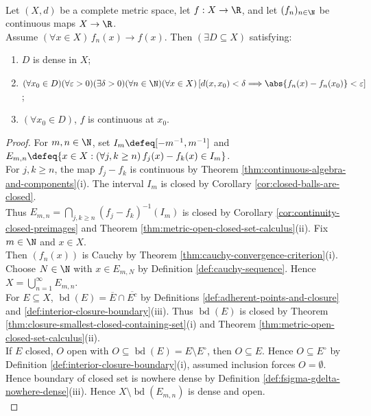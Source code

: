 \begin{theorem} \label{thm:pointwise-limit-continuous-on-dense-set} \\
Let $(X,d)$ be a complete metric space, let $f:X\to\R$, and let $(f_n)_{n\in\N}$ be continuous maps $X\to\R$.\\
Assume $(\forall x\in X)\,f_n(x)\to f(x)$. Then $(\exists D\subseteq X)$ satisfying:
\begin{enumerate}[label=(\roman*)]
\setlength{\itemsep}{0pt}
\item $D$ is dense in $X$;
\item $(\forall x_0\in D)(\forall\varepsilon>0)(\exists\delta>0)(\forall n\in\N)(\forall x\in X)\,[d(x,x_0)<\delta\Longrightarrow\abs{f_n(x)-f_n(x_0)}<\varepsilon]$;
\item $(\forall x_0\in D)$, $f$ is continuous at $x_0$.
\end{enumerate}
\begin{proof}
For $m,n\in\N$, set $I_m\defeq[-m^{-1},m^{-1}]$ and $E_{m,n}\defeq\{x\in X:(\forall j,k\geq n)\,f_j(x)-f_k(x)\in I_m\}$.\\
For $j,k\geq n$, the map $f_j-f_k$ is continuous by Theorem \ref{thm:continuous-algebra-and-components}(i). The interval $I_m$ is closed by Corollary \ref{cor:closed-balls-are-closed}.\\
Thus $E_{m,n}=\bigcap\limits_{j,k\geq n}(f_j-f_k)^{-1}(I_m)$ is closed by Corollary \ref{cor:continuity-closed-preimages} and Theorem \ref{thm:metric-open-closed-set-calculus}(ii). Fix $m\in\N$ and $x\in X$.\\
Then $(f_n(x))$ is Cauchy by Theorem \ref{thm:cauchy-convergence-criterion}(i). Choose $N\in\N$ with $x\in E_{m,N}$ by Definition \ref{def:cauchy-sequence}. Hence $X=\bigcup\limits_{n=1}^{\infty}E_{m,n}$.\\
For $E\subseteq X$, $\operatorname{bd}(E)=\overline{E}\cap\overline{E^c}$ by Definitions \ref{def:adherent-points-and-closure} and \ref{def:interior-closure-boundary}(iii). Thus $\operatorname{bd}(E)$ is closed by Theorem \ref{thm:closure-smallest-closed-containing-set}(i) and Theorem \ref{thm:metric-open-closed-set-calculus}(ii).\\
If $E$ closed, $O$ open with $O\subseteq\operatorname{bd}(E)=E\setminus E^\circ$, then $O\subseteq E$. Hence $O\subseteq E^\circ$ by Definition \ref{def:interior-closure-boundary}(i), assumed inclusion forces $O=\emptyset$.\\
Hence boundary of closed set is nowhere dense by Definition \ref{def:fsigma-gdelta-nowhere-dense}(iii). Hence $X\setminus\operatorname{bd}(E_{m,n})$ is dense and open.\\

\end{proof}
\end{theorem}
